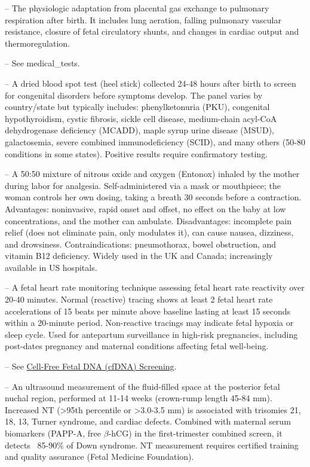 -- The physiologic adaptation from placental gas exchange to pulmonary respiration after birth. It includes lung aeration, falling pulmonary vascular resistance, closure of fetal circulatory shunts, and changes in cardiac output and thermoregulation.

-- See medical\_tests.

-- A dried blood spot test (heel stick) collected 24-48 hours after birth to screen for congenital disorders before symptoms develop. The panel varies by country/state but typically includes: phenylketonuria (PKU), congenital hypothyroidism, cystic fibrosis, sickle cell disease, medium-chain acyl-CoA dehydrogenase deficiency (MCADD), maple syrup urine disease (MSUD), galactosemia, severe combined immunodeficiency (SCID), and many others (50-80 conditions in some states). Positive results require confirmatory testing.

-- A 50:50 mixture of nitrous oxide and oxygen (Entonox) inhaled by the mother during labor for analgesia. Self-administered via a mask or mouthpiece; the woman controls her own dosing, taking a breath 30 seconds before a contraction. Advantages: noninvasive, rapid onset and offset, no effect on the baby at low concentrations, and the mother can ambulate. Disadvantages: incomplete pain relief (does not eliminate pain, only modulates it), can cause nausea, dizziness, and drowsiness. Contraindications: pneumothorax, bowel obstruction, and vitamin B12 deficiency. Widely used in the UK and Canada; increasingly available in US hospitals.

-- A fetal heart rate monitoring technique assessing fetal heart rate reactivity over 20-40 minutes. Normal (reactive) tracing shows at least 2 fetal heart rate accelerations of 15 beats per minute above baseline lasting at least 15 seconds within a 20-minute period. Non-reactive tracings may indicate fetal hypoxia or sleep cycle. Used for antepartum surveillance in high-risk pregnancies, including post-dates pregnancy and maternal conditions affecting fetal well-being.

-- See \hyperlink{Cell-Free Fetal DNA (cfDNA) Screening}{Cell-Free Fetal DNA (cfDNA) Screening}.

-- An ultrasound measurement of the fluid-filled space at the posterior fetal nuchal region, performed at 11-14 weeks (crown-rump length 45-84 mm). Increased NT (>95th percentile or >3.0-3.5 mm) is associated with trisomies 21, 18, 13, Turner syndrome, and cardiac defects. Combined with maternal serum biomarkers (PAPP-A, free $\beta$-hCG) in the first-trimester combined screen, it detects ~85-90\% of Down syndrome. NT measurement requires certified training and quality assurance (Fetal Medicine Foundation).

